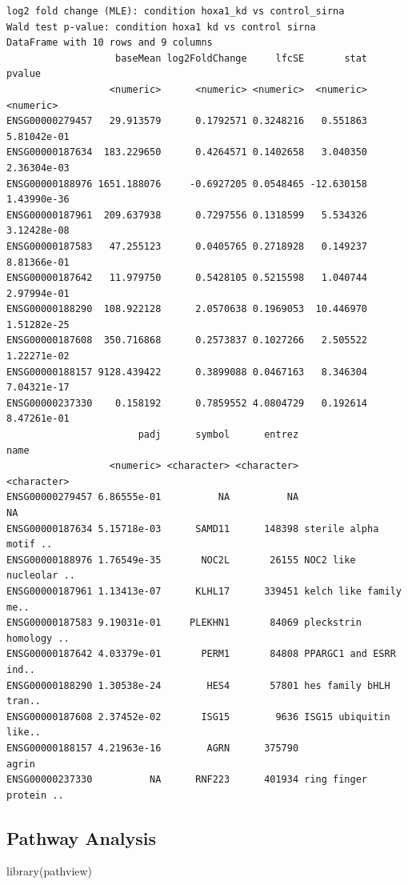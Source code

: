 \documentclass[
  letterpaper,
  DIV=11,
  numbers=noendperiod]{scrartcl}
\newenvironment{Shaded}{\begin{snugshade}}{\end{snugshade}}
\newcommand{\FunctionTok}[1]{\textcolor[rgb]{0.28,0.35,0.67}{#1}}
\newcommand{\NormalTok}[1]{\textcolor[rgb]{0.00,0.23,0.31}{#1}}
\begin{document}
\begin{verbatim}
log2 fold change (MLE): condition hoxa1_kd vs control_sirna 
Wald test p-value: condition hoxa1 kd vs control sirna 
DataFrame with 10 rows and 9 columns
                   baseMean log2FoldChange     lfcSE       stat      pvalue
                  <numeric>      <numeric> <numeric>  <numeric>   <numeric>
ENSG00000279457   29.913579      0.1792571 0.3248216   0.551863 5.81042e-01
ENSG00000187634  183.229650      0.4264571 0.1402658   3.040350 2.36304e-03
ENSG00000188976 1651.188076     -0.6927205 0.0548465 -12.630158 1.43990e-36
ENSG00000187961  209.637938      0.7297556 0.1318599   5.534326 3.12428e-08
ENSG00000187583   47.255123      0.0405765 0.2718928   0.149237 8.81366e-01
ENSG00000187642   11.979750      0.5428105 0.5215598   1.040744 2.97994e-01
ENSG00000188290  108.922128      2.0570638 0.1969053  10.446970 1.51282e-25
ENSG00000187608  350.716868      0.2573837 0.1027266   2.505522 1.22271e-02
ENSG00000188157 9128.439422      0.3899088 0.0467163   8.346304 7.04321e-17
ENSG00000237330    0.158192      0.7859552 4.0804729   0.192614 8.47261e-01
                       padj      symbol      entrez                   name
                  <numeric> <character> <character>            <character>
ENSG00000279457 6.86555e-01          NA          NA                     NA
ENSG00000187634 5.15718e-03      SAMD11      148398 sterile alpha motif ..
ENSG00000188976 1.76549e-35       NOC2L       26155 NOC2 like nucleolar ..
ENSG00000187961 1.13413e-07      KLHL17      339451 kelch like family me..
ENSG00000187583 9.19031e-01     PLEKHN1       84069 pleckstrin homology ..
ENSG00000187642 4.03379e-01       PERM1       84808 PPARGC1 and ESRR ind..
ENSG00000188290 1.30538e-24        HES4       57801 hes family bHLH tran..
ENSG00000187608 2.37452e-02       ISG15        9636 ISG15 ubiquitin like..
ENSG00000188157 4.21963e-16        AGRN      375790                  agrin
ENSG00000237330          NA      RNF223      401934 ring finger protein ..
\end{verbatim}

\hypertarget{pathway-analysis}{%
\subsection{Pathway Analysis}\label{pathway-analysis}}

\begin{Shaded}
\begin{Highlighting}[]
\FunctionTok{library}\NormalTok{(pathview)}
\end{Highlighting}
\end{Shaded}
\end{document}

